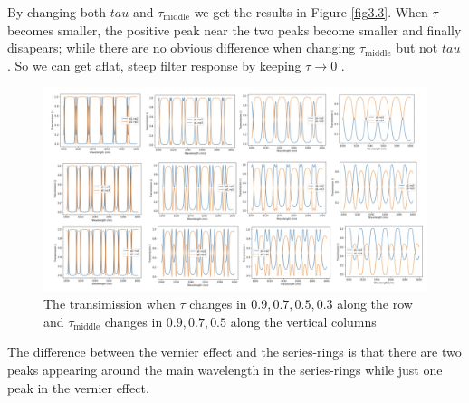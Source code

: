 \documentclass[fontsize=11pt]{scrartcl}
\begin{document}
By changing both $tau$ and $\tau_{\mathrm{middle}}$ we get the results in 
Figure \ref{fig3.3}.
When $\tau$ becomes smaller, the positive peak near the two peaks become
smaller and finally disapears; while there are no obvious difference when
changing $\tau_{\mathrm{middle}}$ but not $tau$. So we can get aflat, steep filter response by 
keeping $\tau \rightarrow 0$ .
\begin{figure}[H]
    \centering
    \includegraphics[width=1\textwidth]{img/fig3.3.png}
    \caption{The transimission when $\tau$ changes in $0.9, 0.7, 0.5, 0.3$
    along the row and $\tau_{\mathrm{middle}}$ changes in $0.9, 0.7, 0.5$ along
    the vertical columns}
    \label{fig3.2}
\end{figure}

The difference between the vernier effect and the series-rings is that
there are two peaks appearing around the main wavelength in the series-rings
while just one peak in the vernier effect.
\pagebreak
\end{document}
